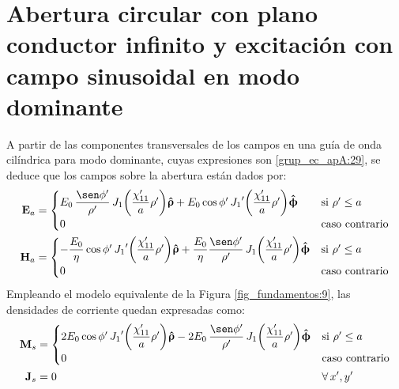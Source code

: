 \section{Abertura circular con plano conductor infinito y excitación con campo sinusoidal en modo dominante}
\label{subsec_apendice_c_abert_circ_inf_dom}

A partir de las componentes transversales de los campos en una guía de onda cilíndrica para modo dominante, cuyas expresiones son \eqref{grup_ec_apA:29}, se deduce que los campos sobre la abertura están dados por:
\begin{align}
\mathbf{E}_a &= 
\begin{cases} 
\makebox[0pt][l]{$E_0\,\dfrac{\sen\phi '}{\rho '}\,J_1\!\left(\dfrac{\chi '_{11}}{a}\rho '\right)\!\versor{\uprho} + E_0\cos\phi '\,{J_1}'\!\left(\dfrac{\chi '_{11}}{a}\rho '\right)\!\versor{\upphi}$}\hphantom{- \dfrac{E_0}{\eta}\cos\phi '\,{J_1}'\!\left(\dfrac{\chi '_{11}}{a}\rho '\right)\!\versor{\uprho} + \dfrac{E_0}{\eta}\dfrac{\sen\phi '}{\rho '}\,J_1\!\left(\dfrac{\chi '_{11}}{a}\rho '\right)\!\versor{\upphi}} &\text{si } \rho '\leq a\\
0 &\text{caso contrario}
\end{cases}
\label{ec_apC:31}\\
\mathbf{H}_a &= 
\begin{cases} 
- \dfrac{E_0}{\eta}\cos\phi '\,{J_1}'\!\left(\dfrac{\chi '_{11}}{a}\rho '\right)\!\versor{\uprho} + \dfrac{E_0}{\eta}\dfrac{\sen\phi '}{\rho '}\,J_1\!\left(\dfrac{\chi '_{11}}{a}\rho '\right)\!\versor{\upphi} &\text{si } \rho '\leq a\\
0  &\text{caso contrario}
\end{cases}
\label{ec_apC:32}
\end{align}
Empleando el modelo equivalente de la Figura \ref{fig_fundamentos:9}, las densidades de corriente quedan expresadas como:
\begin{align}
\mathbf{M}_s &=
\begin{cases}
2E_0\cos\phi '\,{J_1}'\!\left(\dfrac{\chi '_{11}}{a}\rho '\right)\!\versor{\uprho} - 2E_0\,\dfrac{\sen\phi '}{\rho '}\,J_1\!\left(\dfrac{\chi '_{11}}{a}\rho '\right)\!\versor{\upphi} &\text{si } \rho ' \leq a\\
0 &\text{caso contrario}
\end{cases}
\label{ec_apC:33}\\
\mathbf{J}_s &= \makebox[0pt][l]{$0$} 
\hphantom{\begin{cases}2E_0\cos\phi '\,{J_1}'\!\left(\dfrac{\chi '_{11}}{a}\rho '\right)\!\versor{\uprho} - 2E_0\,\dfrac{\sen\phi '}{\rho '}\,J_1\!\left(\dfrac{\chi '_{11}}{a}\rho '\right)\!\versor{\upphi}\\0\end{cases}}\kern-\nulldelimiterspace
\forall\,x',y'
\label{ec_apC:34}
\end{align}
